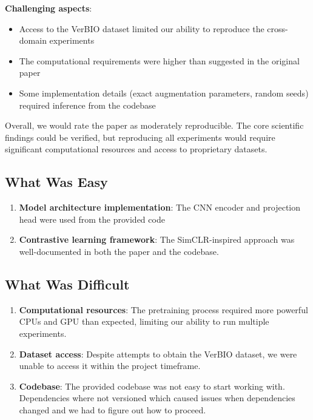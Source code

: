 \documentclass[10pt,letterpaper,twocolumn]{article}
\begin{document}
\textbf{Challenging aspects}:
\begin{itemize}
    \item Access to the VerBIO dataset limited our ability to reproduce the cross-domain experiments
    \item The computational requirements were higher than suggested in the original paper
    \item Some implementation details (exact augmentation parameters, random seeds) required inference from the codebase
\end{itemize}

Overall, we would rate the paper as moderately reproducible. The core scientific findings could be verified, but reproducing all experiments would require significant computational resources and access to proprietary datasets.

\subsection{What Was Easy}

\begin{enumerate}
    \item \textbf{Model architecture implementation}: The CNN encoder and projection head were used from the provided code
    
    \item \textbf{Contrastive learning framework}: The SimCLR-inspired approach was well-documented in both the paper and the codebase.
\end{enumerate}

\subsection{What Was Difficult}

\begin{enumerate}
    \item \textbf{Computational resources}: The pretraining process required more powerful CPUs and GPU than expected, limiting our ability to run multiple experiments.
    
    \item \textbf{Dataset access}: Despite attempts to obtain the VerBIO dataset, we were unable to access it within the project timeframe.
    
    \item \textbf{Codebase}: The provided codebase was not easy to start working with. Dependencies where not versioned which caused issues when dependencies changed and we had to figure out how to proceed.
\end{enumerate}
\end{document}
